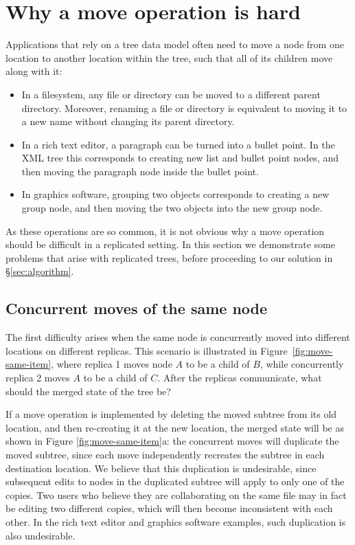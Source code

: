 \documentclass[10pt,journal,compsoc]{IEEEtran}
\begin{document}
\section{Why a move operation is hard}\label{sec:move-is-hard}

Applications that rely on a tree data model often need to move a node from one location to another location within the tree, such that all of its children move along with it:
\begin{itemize}
    \item In a filesystem, any file or directory can be moved to a different parent directory.
        Moreover, renaming a file or directory is equivalent to moving it to a new name without changing its parent directory.
    \item In a rich text editor, a paragraph can be turned into a bullet point.
        In the XML tree this corresponds to creating new list and bullet point nodes, and then moving the paragraph node inside the bullet point.
    \item In graphics software, grouping two objects corresponds to creating a new group node, and then moving the two objects into the new group node.
\end{itemize}
As these operations are so common, it is not obvious why a move operation should be difficult in a replicated setting.
In this section we demonstrate some problems that arise with replicated trees, before proceeding to our solution in \S\ref{sec:algorithm}.

\subsection{Concurrent moves of the same node}\label{sec:move-same-item}

The first difficulty arises when the same node is concurrently moved into different locations on different replicas.
This scenario is illustrated in Figure~\ref{fig:move-same-item}, where replica 1 moves node $A$ to be a child of $B$, while concurrently replica 2 moves $A$ to be a child of $C$.
After the replicas communicate, what should the merged state of the tree be?

If a move operation is implemented by deleting the moved subtree from its old location, and then re-creating it at the new location, the merged state will be as shown in Figure \ref{fig:move-same-item}a: the concurrent moves will duplicate the moved subtree, since each move independently recreates the subtree in each destination location.
We believe that this duplication is undesirable, since subsequent edits to nodes in the duplicated subtree will apply to only one of the copies.
Two users who believe they are collaborating on the same file may in fact be editing two different copies, which will then become inconsistent with each other.
In the rich text editor and graphics software examples, such duplication is also undesirable.
\end{document}
